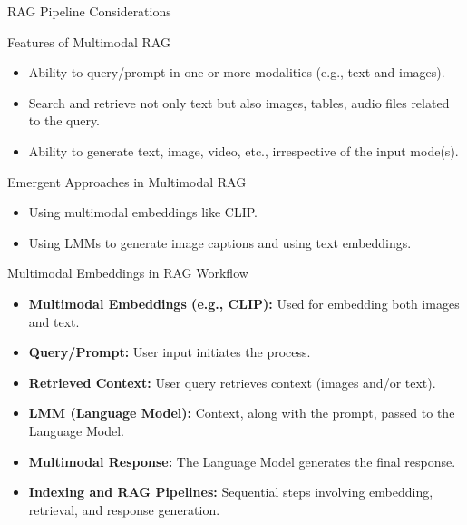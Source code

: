 \begin{frame}[fragile]{RAG Pipeline Considerations}
\begin{itemize}
\begin{itemize}
\begin{frame}[fragile]{Features of Multimodal RAG}
    \begin{itemize}
        \item Ability to query/prompt in one or more modalities (e.g., text and images).
        \item Search and retrieve not only text but also images, tables, audio files related to the query.
        \item Ability to generate text, image, video, etc., irrespective of the input mode(s).
    \end{itemize}
\end{frame}

\begin{frame}[fragile]{Emergent Approaches in Multimodal RAG}
    \begin{itemize}
        \item Using multimodal embeddings like CLIP.
        \item Using LMMs to generate image captions and using text embeddings.
    \end{itemize}
\end{frame}

\begin{frame}[fragile]{Multimodal Embeddings in RAG Workflow}
    \begin{itemize}
        \item \textbf{Multimodal Embeddings (e.g., CLIP):} Used for embedding both images and text.
        \item \textbf{Query/Prompt:} User input initiates the process.
        \item \textbf{Retrieved Context:} User query retrieves context (images and/or text).
        \item \textbf{LMM (Language Model):} Context, along with the prompt, passed to the Language Model.
        \item \textbf{Multimodal Response:} The Language Model generates the final response.
        \item \textbf{Indexing and RAG Pipelines:} Sequential steps involving embedding, retrieval, and response generation.
    \end{itemize}
\end{frame}



\end{itemize}
\end{itemize}
\end{frame}
